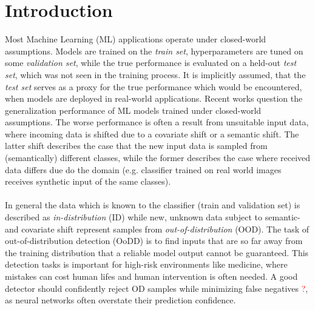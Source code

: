 \section{Introduction}
\raggedbottom

Most Machine Learning (ML) applications operate under closed-world assumptions.
Models are trained on the \textit{train set}, hyperparameters are tuned on some \textit{validation set}, while the true performance is evaluated on a held-out \textit{test set}, which was not seen in the training process.
It is implicitly assumed, that the \textit{test set} serves as a proxy for the true performance which would be encountered, when models are deployed in real-world applications.
Recent works question the generalization performance of ML models trained under closed-world assumptions.
The worse performance is often a result from unsuitable input data, where incoming data is shifted due to a covariate shift or a semantic shift.
The latter shift describes the case that the new input data is sampled from (semantically) different classes, while the former describes the case where received data differs due do the domain (e.g. classifier trained on real world images receives synthetic input of the same classes).
\\
\\
In general the data which is known to the classifier (train and validation set) is described as \textit{in-distribution} (ID) while new, unknown data subject to semantic- and covariate shift represent samples from \textit{out-of-distribution} (OOD).
The task of out-of-distribution detection (OoDD) is to find inputs that are so far away from the training distribution that a reliable model output cannot be guaranteed.
This detection tasks is important for high-risk environments like medicine, where mistakes can cost human lifes and human intervention is often needed.
A good detector should confidently reject OD samples while minimizing false negatives \textcolor{red}{?}, as neural networks often overstate their prediction confidence.